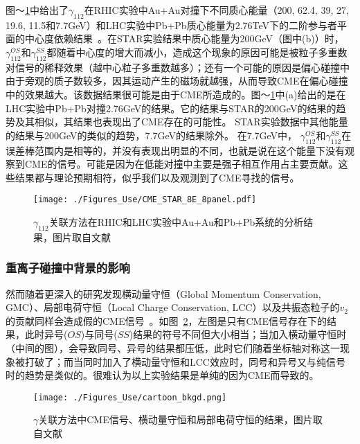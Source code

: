  图～\ref{fig:gamma112}中给出了$\gamma_112$在RHIC实验中Au+Au对撞下不同质心能量（200,  62.4, 39, 27, 19.6, 11.5和7.7GeV）和LHC实验中Pb+Pb质心能量为2.76TeV下的二阶参与者平面的中心度依赖结果~\cite{Review3}。在STAR实验结果中质心能量为200GeV（图中(b)）时，$\gamma_{112}^{OS}$和$\gamma_{112}^{SS}$都随着中心度的增大而减小，造成这个现象的原因可能是被粒子多重数对信号的稀释效果（越中心粒子多重数越多）；还有一个可能的原因是偏心碰撞中由于旁观的质子数较多，因其运动产生的磁场就越强，从而导致CME在偏心碰撞中的效果越大。该数据结果很可能是由于CME所造成的。图～\ref{fig:gamma112}中(a)给出的是在LHC实验中Pb+Pb对撞2.76GeV的结果。它的结果与STAR的200GeV的结果的趋势及其相似，其结果也表现出了CME存在的可能性。 STAR实验数据中其他能量的结果与200GeV的类似的趋势，7.7GeV的结果除外。 在7.7GeV中， $\gamma_{112}^{OS}$和$\gamma_{112}^{SS}$在误差棒范围内是相等的，并没有表现出明显的不同，也就是说在这个能量下没有观察到CME的信号。可能是因为在低能对撞中主要是强子相互作用占主要贡献。这些结果都与理论预期相符，似乎我们以及观测到了CME寻找的信号。
 
\begin{figure}[htb]
\begin{center}
\texttt{[image: ./Figures\_Use/CME\_STAR\_8E\_8panel.pdf]}
\end{center}
\caption[$\gamma_112$关联方法在RHIC和LHC实验中Au+Au和Pb+Pb系统的分析结果]{$\gamma_112$关联方法在RHIC和LHC实验中Au+Au和Pb+Pb系统的分析结果，图片取自文献~\cite{Review3}}
\label{fig:gamma112}
\end{figure}

\subsubsection{重离子碰撞中背景的影响}

然而随着更深入的研究发现横动量守恒（Global Momentum Conservation, GMC）、局部电荷守恒（Local Charge Conservation, LCC）以及共振态粒子的$v_{2}$的贡献同样会造成假的CME信号~\cite{Review2}。如图~\ref{fig:background}，左图是只有CME信号存在下的结果，此时异号($OS$)与同号($SS$)结果的符号不同但大小相当；当加入横动量守恒时（中间的图），会导致同号、异号的结果都压低，此时它们随着坐标轴对称这一现象被打破了；而当同时加入了横动量守恒和LCC效应时，同号和异号又与纯信号时的趋势是类似的。很难认为以上实验结果是单纯的因为CME而导致的。

\begin{figure}[htb]
\begin{center}
\texttt{[image: ./Figures\_Use/cartoon\_bkgd.png]}
\end{center}
\caption{$\gamma$关联方法中CME信号、横动量守恒和局部电荷守恒的结果，图片取自文献~\cite{Review3}}
\label{fig:background}
\end{figure}

